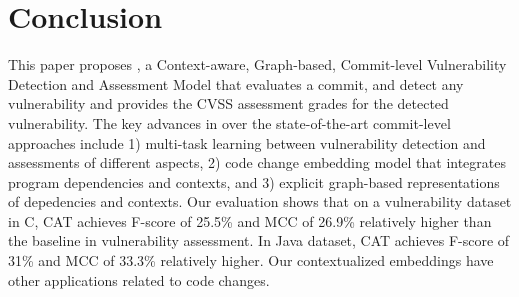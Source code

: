 \section{Conclusion}

This paper proposes {\tool}, a Context-aware, Graph-based,
Commit-level Vulnerability Detection and Assessment Model that
evaluates a commit, and detect any vulnerability and provides the CVSS
assessment grades for the detected vulnerability. The key advances in
{\tool} over the state-of-the-art commit-level approaches include 1)
multi-task learning between vulnerability detection and assessments of
different aspects, 2) code change embedding model that integrates
program dependencies and contexts, and 3) explicit graph-based
representations of depedencies and contexts. Our evaluation shows that
on a vulnerability dataset in C, CAT achieves F-score of 25.5\% and
MCC of 26.9\% relatively higher than the baseline in vulnerability
assessment. In Java dataset, CAT achieves F-score of 31\% and MCC of
33.3\% relatively higher. Our contextualized embeddings have other
applications related to code changes.


















